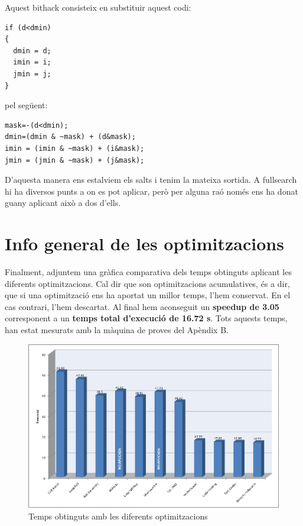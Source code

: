 Aquest bithack consisteix en substituir aquest codi:

\begin{lstlisting}
if (d<dmin)
{
  dmin = d;
  imin = i;
  jmin = j;
}
\end{lstlisting}

pel següent:

\begin{lstlisting}
mask=-(d<dmin);
dmin=(dmin & ~mask) + (d&mask);
imin = (imin & ~mask) + (i&mask);
jmin = (jmin & ~mask) + (j&mask);
\end{lstlisting}

D'aquesta manera ens estalviem els salts i tenim la mateixa sortida. A fullsearch hi ha diversos punts a on es pot aplicar, però per alguna raó només ens ha donat guany aplicant això a dos d'ells.

\section{Info general de les optimitzacions}

Finalment, adjuntem una gràfica comparativa dels temps obtinguts aplicant les diferents optimitzacions. Cal dir que son optimitzacions acumulatives, és a dir, que si una optimització ens ha aportat un millor temps, l'hem conservat. En el cas contrari, l'hem descartat. Al final hem aconseguit un \textbf{speedup de 3.05} corresponent a un \textbf{temps total d'execució de 16.72 s}. Tots aquests temps, han estat mesurats amb la màquina de proves del Apèndix B.


\begin{figure}[hbtp]
\begin{center}
\includegraphics[scale=0.4]{img/image001.png}
\caption{Temps obtinguts amb les diferents optimitzacions}
\end{center}
\end{figure}
